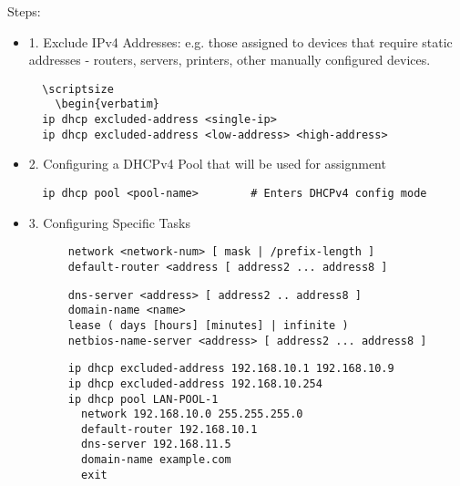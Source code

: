 \documentclass[../EngineeringJournal_CDavis.tex]{subfiles}
\begin{document}
\hspace{0.2cm}
\begin{tcolorbox}[width=6.3in]
Steps:
\begin{itemize}
\item{1.} Exclude IPv4 Addresses: e.g. those assigned to devices that require static addresses - routers, servers, printers, other manually configured devices.
  \begin{verbatim}
  \scriptsize 
    \begin{verbatim}
  ip dhcp excluded-address <single-ip>
  ip dhcp excluded-address <low-address> <high-address>
  \end{verbatim}
  \normalsize  

\item{2.} Configuring a DHCPv4 Pool that will be used for assignment
  \scriptsize 
  \begin{verbatim}
  ip dhcp pool <pool-name>        # Enters DHCPv4 config mode
  \end{verbatim}
  \normalsize  

\item{3.} Configuring Specific Tasks
	\scriptsize 
	\begin{verbatim}
	  network <network-num> [ mask | /prefix-length ]
	  default-router <address [ address2 ... address8 ]
	\end{verbatim}
	\normalsize  

	\scriptsize 
	\begin{verbatim}
	  dns-server <address> [ address2 .. address8 ]
	  domain-name <name>
	  lease ( days [hours] [minutes] | infinite )
	  netbios-name-server <address> [ address2 ... address8 ]
	\end{verbatim}
	\normalsize  
	\scriptsize 
	\begin{verbatim}
	  ip dhcp excluded-address 192.168.10.1 192.168.10.9
	  ip dhcp excluded-address 192.168.10.254
	  ip dhcp pool LAN-POOL-1
	    network 192.168.10.0 255.255.255.0
	    default-router 192.168.10.1
	    dns-server 192.168.11.5
	    domain-name example.com
	    exit
	\end{verbatim}
\end{itemize}
\end{tcolorbox}
\hspace{0.2cm}
\normalsize  


\end{document}
